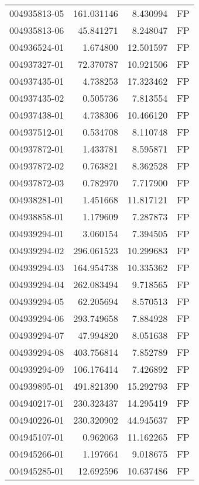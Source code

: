 \begin{tabular}{lrrl}
004935813-05 &  161.031146 &       8.430994 &   FP \\
004935813-06 &   45.841271 &       8.248047 &   FP \\
004936524-01 &    1.674800 &      12.501597 &   FP \\
004937327-01 &   72.370787 &      10.921506 &   FP \\
004937435-01 &    4.738253 &      17.323462 &   FP \\
004937435-02 &    0.505736 &       7.813554 &   FP \\
004937438-01 &    4.738306 &      10.466120 &   FP \\
004937512-01 &    0.534708 &       8.110748 &   FP \\
004937872-01 &    1.433781 &       8.595871 &   FP \\
004937872-02 &    0.763821 &       8.362528 &   FP \\
004937872-03 &    0.782970 &       7.717900 &   FP \\
004938281-01 &    1.451668 &      11.817121 &   FP \\
004938858-01 &    1.179609 &       7.287873 &   FP \\
004939294-01 &    3.060154 &       7.394505 &   FP \\
004939294-02 &  296.061523 &      10.299683 &   FP \\
004939294-03 &  164.954738 &      10.335362 &   FP \\
004939294-04 &  262.083494 &       9.718565 &   FP \\
004939294-05 &   62.205694 &       8.570513 &   FP \\
004939294-06 &  293.749658 &       7.884928 &   FP \\
004939294-07 &   47.994820 &       8.051638 &   FP \\
004939294-08 &  403.756814 &       7.852789 &   FP \\
004939294-09 &  106.176414 &       7.426892 &   FP \\
004939895-01 &  491.821390 &      15.292793 &   FP \\
004940217-01 &  230.323437 &      14.295419 &   FP \\
004940226-01 &  230.320902 &      44.945637 &   FP \\
004945107-01 &    0.962063 &      11.162265 &   FP \\
004945266-01 &    1.197664 &       9.018675 &   FP \\
004945285-01 &   12.692596 &      10.637486 &   FP \\

\end{tabular}
